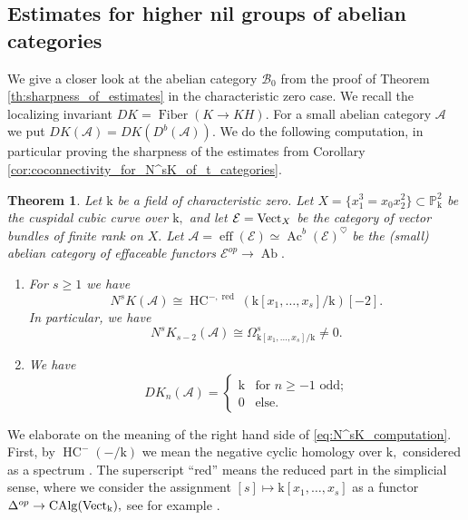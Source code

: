 \documentclass[11pt,leqno]{amsart}
\newtheorem{theo}{Theorem}[section]
\numberwithin{equation}{section}
\def\PP{{\mathbb P}}
\newcommand{\Fiber}{\operatorname{Fiber}}
\newcommand{\red}{\operatorname{red}}
\newcommand{\eff}{\operatorname{eff}}
\newcommand{\mk}{\mathrm k}
\newcommand{\cA}{{\mathcal A}}
\newcommand{\cB}{{\mathcal B}}
\newcommand{\cE}{{\mathcal E}}
\newcommand{\HC}{\operatorname{HC}}
\newcommand{\CAlg}{\operatorname{CAlg}}
\newcommand{\Ab}{\operatorname{Ab}}
\newcommand{\Vect}{{\rm Vect}}
\newcommand{\Ac}{\operatorname{Ac}}
\begin{document}
\subsection{Estimates for higher nil groups of abelian categories}

We give a closer look at the abelian category $\cB_0$ from the proof of Theorem \ref{th:sharpness_of_estimates} in the characteristic zero case. We recall the localizing invariant $DK=\Fiber(K\to KH).$ For a small abelian category $\cA$ we put $DK(\cA)=DK(D^b(\cA)).$ We do the following computation, in particular proving the sharpness of the estimates from Corollary \ref{cor:coconnectivity_for_N^sK_of_t_categories}.

\begin{theo}\label{th:sharpness_for_N^sK}
Let $\mk$ be a field of characteristic zero. Let $X=\{x_1^3=x_0 x_2^2\}\subset\PP^2_{\mk}$ be the cuspidal cubic curve over $\mk,$ and let $\cE=\Vect_X$ be the category of vector bundles of finite rank on $X.$ Let $\cA=\eff(\cE)\simeq\Ac^b(\cE)^{\heartsuit}$ be the (small) abelian category of effaceable functors $\cE^{op}\to\Ab.$ 

\begin{enumerate}[label=(\roman*),ref=(\roman*)]
	\item For $s\geq 1$ we have
	\begin{equation}\label{eq:N^sK_computation}
		N^s K(\cA)\cong \HC^{-,\red}(\mk[x_1,\dots,x_s]/\mk)[-2].
	\end{equation}
	In particular, we have 
	\begin{equation*}
		N^s K_{s-2}(\cA)\cong \Omega^s_{\mk[x_1,\dots,x_s]/\mk}\ne 0.
	\end{equation*} \label{N^sK_of_effaceable}
\item We have
\begin{equation}\label{eq:DK_of_effaceable}
	DK_n(\cA)=\begin{cases}
		\mk & \text{for }n\geq -1\text{ odd;}\\
		0 & \text{else.}
	\end{cases}
\end{equation} \label{DK_of_effaceable}
\end{enumerate}
\end{theo}

We elaborate on the meaning of the right hand side of \eqref{eq:N^sK_computation}. First, by $\HC^-(-/\mk)$ we mean the negative cyclic homology over $\mk,$ considered as a spectrum \cite{Tsy83, FT85, Con94}. The superscript ``red'' means the reduced part in the simplicial sense, where we consider the assignment $[s]\mapsto \mk[x_1,\dots,x_s]$ as a functor $\Delta^{op}\to \CAlg(\Vect_{\mk}),$ see for example \cite[Section 8]{E25c}.
\end{document}
